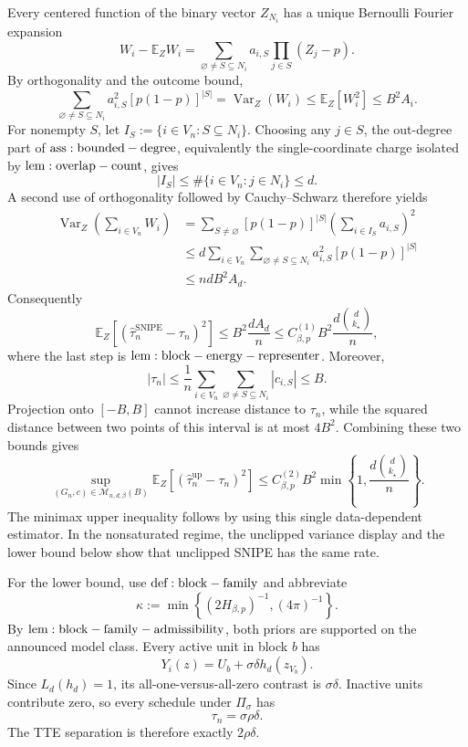Every centered function of the binary vector \(Z_{N_i}\) has a unique Bernoulli Fourier expansion
\[
W_i-\mathbb E_ZW_i
=\sum_{\varnothing\ne S\subseteq N_i}a_{i,S}
\prod_{j\in S}(Z_j-p).
\]
By orthogonality and the outcome bound,
\[
\sum_{\varnothing\ne S\subseteq N_i}a_{i,S}^2[p(1-p)]^{|S|}
=\operatorname{Var}_Z(W_i)
\le\mathbb E_Z[W_i^2]
\le B^2A_i.
\]
For nonempty \(S\), let \(I_S:=\{i\in V_n:S\subseteq N_i\}\). Choosing any \(j\in S\), the out-degree part of \({\rm ass:bounded-degree}\), equivalently the single-coordinate charge isolated by \({\rm lem:overlap-count}\), gives
\[
|I_S|\le\#\{i\in V_n:j\in N_i\}\le d.
\]
A second use of orthogonality followed by Cauchy--Schwarz therefore yields
\[
\begin{aligned}
\operatorname{Var}_Z\!\left(\sum_{i\in V_n}W_i\right)
&=\sum_{S\ne\varnothing}[p(1-p)]^{|S|}
\left(\sum_{i\in I_S}a_{i,S}\right)^2\\
&\le d\sum_{i\in V_n}\sum_{\varnothing\ne S\subseteq N_i}
a_{i,S}^2[p(1-p)]^{|S|}\\
&\le ndB^2A_d.
\end{aligned}
\]
Consequently
\[
\mathbb E_Z[(\widehat\tau_n^{\mathrm{SNIPE}}-\tau_n)^2]
\le B^2\frac{dA_d}{n}
\le C_{\beta,p}^{(1)}B^2\frac{d\binom d{k_\star}}{n},
\]
where the last step is \({\rm lem:block-energy-representer}\). Moreover,
\[
|\tau_n|
\le\frac1n\sum_{i\in V_n}\sum_{\varnothing\ne S\subseteq N_i}|c_{i,S}|
\le B.
\]
Projection onto \([-B,B]\) cannot increase distance to \(\tau_n\), while the squared distance between two points of this interval is at most \(4B^2\). Combining these two bounds gives
\[
\sup_{(G_n,c)\in\mathcal M_{n,d,\beta}(B)}
\mathbb E_Z[(\widehat\tau_n^{\mathrm{up}}-\tau_n)^2]
\le C_{\beta,p}^{(2)}B^2
\min\!\left\{1,\frac{d\binom d{k_\star}}{n}\right\}.
\]
The minimax upper inequality follows by using this single data-dependent estimator. In the nonsaturated regime, the unclipped variance display and the lower bound below show that unclipped SNIPE has the same rate.

For the lower bound, use \({\rm def:block-family}\) and abbreviate
\[
\kappa:=\min\!\left\{(2H_{\beta,p})^{-1},(4\pi)^{-1}\right\}.
\]
By \({\rm lem:block-family-admissibility}\), both priors are supported on the announced model class. Every active unit in block \(b\) has
\[
Y_i(z)=U_b+\sigma\delta h_d(z_{V_b}).
\]
Since \(L_d(h_d)=1\), its all-one-versus-all-zero contrast is \(\sigma\delta\). Inactive units contribute zero, so every schedule under \(\Pi_\sigma\) has
\[
\tau_n=\sigma\rho\delta.
\]
The TTE separation is therefore exactly \(2\rho\delta\).


